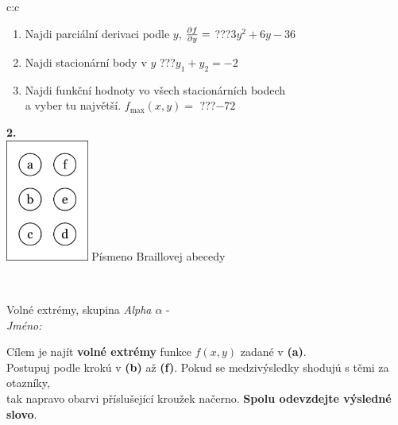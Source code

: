 \documentclass[10pt]{report}
\begin{document}
\begin{tabular}{c:c}
\begin{minipage}[c][104.5mm][t]{0.5\linewidth}
\begin{center}
\begin{minipage}{0.79\linewidth}
\begin{center}
\begin{varwidth}{\linewidth}
\begin{enumerate}
\item Najdi parciální derivaci podle $y$, $\pdv{f}{y}=$\quad \dotfill\; ???\;\dotfill \quad $3y^2+6y-36$
\item Najdi stacionární body v $y$\quad \dotfill\; ???\;\dotfill \quad $y_1+y_2=-2$
\item Najdi funkční hodnoty vo všech stacionárních bodech \\ \phantom{xxxxxx} a vyber tu najvětší. $f_{\text{max}}(x,y)=$\quad \dotfill\; ???\;\dotfill \quad $-72$
\end{enumerate}
\end{varwidth}
\end{center}
\end{minipage}
\begin{minipage}{0.20\linewidth}
\begin{center}
{\Huge\bfseries 2.} \\[2mm]
\includegraphics[height=40mm]{../images/braille.png}
{\small Písmeno Braillovej abecedy}
\end{center}
\end{minipage}
\end{center}
\end{minipage}
\\ \hdashline
\begin{minipage}[c][104.5mm][t]{0.5\linewidth}
\begin{center}
\vspace{7mm}
{\huge Volné extrémy, skupina \textit{Alpha $\alpha$} -}\\[5mm]
\textit{Jméno:}\phantom{xxxxxxxxxxxxxxxxxxxxxxxxxxxxxxxxxxxxxxxxxxxxxxxxxxxxxxxxxxxxxxxxx}\\[5mm]
\begin{minipage}{0.95\linewidth}
\begin{center}
Cílem je najít \textbf{volné extrémy} funkce $f(x,y)$ zadané v \textbf{(a)}.\\Postupuj podle krokú v \textbf{(b)} až \textbf{(f)}. Pokud se medzivýsledky shodujú s těmi za otazníky,\\tak napravo obarvi příslušející kroužek načerno. \textbf{Spolu odevzdejte výsledné slovo}.

\end{center}
\end{minipage}
\end{center}
\end{minipage}
\end{tabular}
\end{document}

